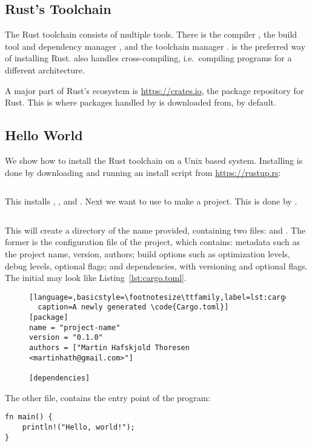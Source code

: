 \documentclass[a4paper,twoside]{report}
\begin{document}
\begin{appendices}
  \chapter{Rust's Toolchain}
  The Rust toolchain consists of multiple tools.
  There is the compiler \rustc{}, the build tool and dependency manager \cargo{},
  and the toolchain manager \rustup.
  \rustup{} is the preferred way of installing Rust.
  \rustup{} also handles cross-compiling, i.e.\ compiling programs for a different
  architecture.

  A major part of Rust's ecosystem is \url{https://crates.io}, the package repository
  for Rust. This is where packages handled by \cargo{} is downloaded from, by default.

  \section{Hello World}
  We show how to install the Rust toolchain on a Unix based system.
  Installing \rustup{} is done by downloading and running an install script from
  \url{https://rustup.rs}:
  \begin{lstlisting}[language=Bash,numbers=none]
% curl https://sh.rustup.rs -sSf | sh
  \end{lstlisting}
  This installs \rustup{}, \cargo{}, and \rustc{}.
  Next we want to use \cargo{} to make a project. This is done by .
  \begin{lstlisting}[language=Bash,numbers=none]
% cargo init --bin <name-of-project>
  \end{lstlisting}
  This will create a directory of the name provided, containing two files:
   and .
  The former is the configuration file of the project, which contains:
  metadata such as the project name, version, authors;
  build options such as optimization levels, debug levels, optional flags;
  and dependencies, with versioning and optional flags.
  The initial  may look like Listing~\ref{lst:cargo.toml}.
  \begin{figure}[ht]
  \begin{lstlisting}[language=,basicstyle=\footnotesize\ttfamily,label=lst:cargo.toml,
  caption=A newly generated \code{Cargo.toml}]
[package]
name = "project-name"
version = "0.1.0"
authors = ["Martin Hafskjold Thoresen <martinhath@gmail.com>"]

[dependencies]
  \end{lstlisting}
\end{figure}
  The other file,  contains the entry point of the program:
  \begin{lstlisting}
fn main() {
    println!("Hello, world!");
}
  \end{lstlisting}


\end{appendices}
\end{document}
